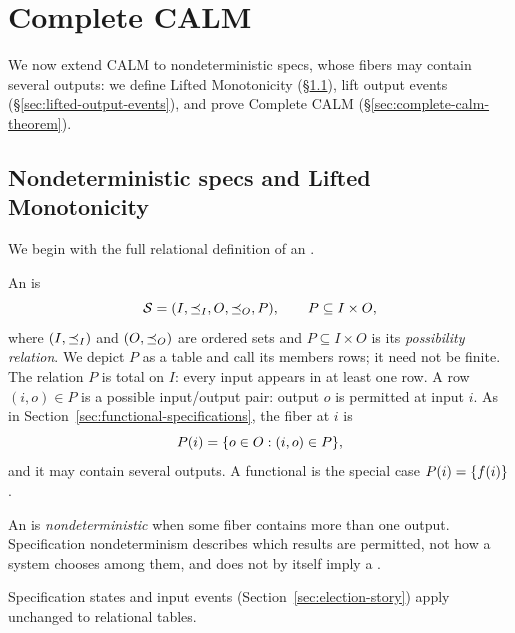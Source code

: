 \section{Complete CALM}
\label{sec:complete-calm}

We now extend CALM to nondeterministic specs, whose fibers may contain several outputs: we define Lifted Monotonicity (\S\ref{sec:relational-specifications}), lift output events (\S\ref{sec:lifted-output-events}), and prove Complete CALM (\S\ref{sec:complete-calm-theorem}).

\subsection{Nondeterministic specs and Lifted Monotonicity}
\label{sec:relational-specifications}

We begin with the full relational definition of an \spectype.
\begin{definition}[\Spectype]
\label{def:relational-specification}
An \emph{\spectype} is
        \begin{equation}
  \mathcal{S}=(I,\preceq_I,O,\preceq_O,P),
  \qquad P\subseteq I\times O,
  \label{eq:relational-specification}
        \end{equation}
  where $(I,\preceq_I)$ and $(O,\preceq_O)$ are ordered sets and
  $P\subseteq I\times O$ is its \emph{possibility relation}.  We depict $P$ as
a table and call its members rows; it need not be finite.  The relation $P$
  is total on $I$: every input appears in at least one row.  A row $(i,o)\in P$
  is a possible input/output pair: output $o$ is permitted at input $i$.  As in
  Section~\ref{sec:functional-specifications}, the fiber at $i$ is
        \begin{equation}
  P(i)=\{o\in O:(i,o)\in P\},
  \label{eq:fiber}
        \end{equation}
  and it may contain several outputs.  A functional \spectype is the special
  case $P(i)=\{f(i)\}$.
\end{definition}

\begin{definition}
\label{def:nondeterministic}
An \spectype is \emph{nondeterministic} when some fiber
contains more than one output.  Specification nondeterminism describes
which results are permitted, not how a system chooses among them, and does not
by itself imply a \commitment.
\end{definition}

Specification states and input events
(Section~\ref{sec:election-story})
apply unchanged to relational tables.

